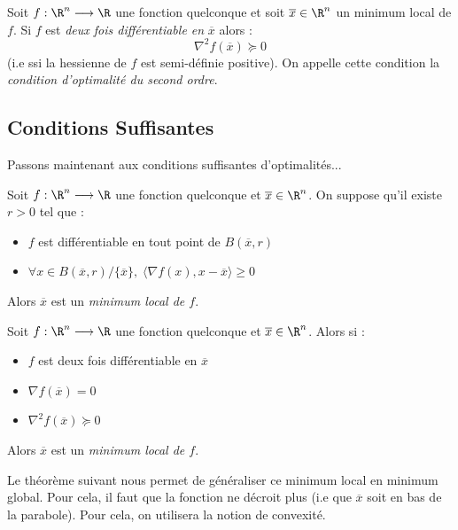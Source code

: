 \begin{theorem}[CN2]
    Soit $f : \R^n \longrightarrow \R$ une fonction quelconque et soit $ \overline{x} \in \R^n$ un minimum 
    local de $f$. Si $f$ est \emph{deux fois différentiable en} $ \overline{x}$ alors : 
        \begin{equation}\label{eq:CN-optimalite-second-ordre}
            \nabla^2 f( \overline{x}) \succeq 0
        \end{equation}
    (i.e ssi la hessienne de $f$ est semi-définie positive). 
    On appelle cette condition la \emph{condition d'optimalité du second ordre}. 
\end{theorem}

\subsection{Conditions Suffisantes}

Passons maintenant aux conditions suffisantes d'optimalités... 

\begin{theorem}[CS1]
    Soit $f : \R^n \longrightarrow \R$ une fonction quelconque et $ \overline{x} \in \R^n$. On suppose qu'il existe 
    $r > 0 $ tel que : 
    \begin{itemize}
        \item $f$ est différentiable en tout point de $B(\overline{x}, r)$ 
        \item $ \forall x \in B( \overline{x}, r) / \{\overline{x}\}, \; \langle \nabla f(x), x - \overline{x} \rangle \geqslant 0 $
    \end{itemize}
    Alors $ \overline{x}$ est un \emph{minimum local de $f$}. 
\end{theorem}

\begin{theorem}[CS2]
    Soit $f : \R^n \longrightarrow \R$ une fonction quelconque et $ \overline{x} \in \R^n$. Alors si :
    \begin{itemize}
        \item $f$ est deux fois différentiable en $ \overline{x}$ 
        \item $ \nabla f( \overline{x}) = 0$ 
        \item $ \nabla^2 f( \overline{x}) \succeq 0 $
    \end{itemize}
    Alors $ \overline{x}$ est un \emph{minimum local de $f$}. 
\end{theorem}

Le théorème suivant nous permet de généraliser ce minimum local en minimum global. Pour cela, 
il faut que la fonction ne décroit plus (i.e que $ \overline{x}$ soit en bas de la parabole). 
Pour cela, on utilisera la notion de convexité. 

